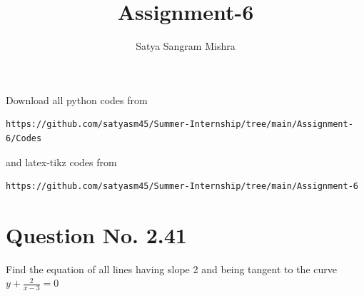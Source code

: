 \documentclass[journal,12pt,twocolumn]{IEEEtran}
\begin{document}
     \def\centbox#1{\makebox[0in]{#1}}
     \def\topbox#1{\raisebox{-\baselineskip}[0in][0in]{#1}}
     \def\midbox#1{\raisebox{-0.5\baselineskip}[0in][0in]{#1}}
\vspace{3cm}
\title{Assignment-6}
\author{Satya Sangram Mishra}
\maketitle
\newpage
\bigskip
\renewcommand{\thefigure}{\theenumi}
\renewcommand{\thetable}{\theenumi}
Download all python codes from 
\begin{lstlisting}
https://github.com/satyasm45/Summer-Internship/tree/main/Assignment-6/Codes
\end{lstlisting}
%
and latex-tikz codes from 
%
\begin{lstlisting}
https://github.com/satyasm45/Summer-Internship/tree/main/Assignment-6
\end{lstlisting}
%
\section{Question No. 2.41}
Find the equation of all lines having slope 2 and being tangent to the curve $y+\frac{2}{x-3}=0$
%
\end{document}
